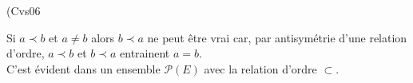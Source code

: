 \begin{tiny}(Cvs06\end{tiny} 
Si $a\prec b$ et $a\neq b$ alors $b\prec a$ ne peut être vrai car, par antisymétrie d'une relation d'ordre, $a\prec b$ et $b\prec a$ entrainent $a=b$.\\
C'est évident dans un ensemble $\mathcal{P}(E)$ avec la relation d'ordre $\subset$.
